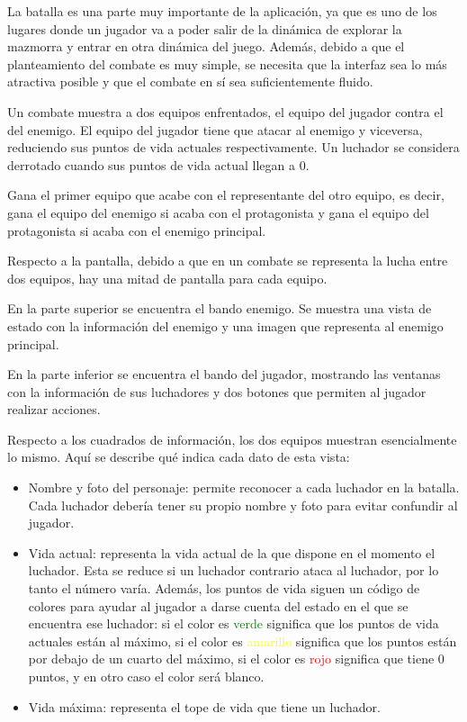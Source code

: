 La batalla es una parte muy importante de la aplicación, ya que es uno de los lugares donde un jugador va a poder salir de la dinámica de explorar la mazmorra y entrar en otra dinámica del juego.
Además, debido a que el planteamiento del combate es muy simple, se necesita que la interfaz sea lo más atractiva posible y que el combate en sí sea suficientemente fluido.

Un combate muestra a dos equipos enfrentados, el equipo del jugador contra el del enemigo. El equipo del jugador tiene que atacar al enemigo y viceversa, reduciendo sus puntos de vida actuales respectivamente. Un luchador se considera derrotado cuando sus puntos de vida actual llegan a 0.

Gana el primer equipo que acabe con el representante del otro equipo, es decir, gana el equipo del enemigo si acaba con el protagonista y gana el equipo del protagonista si acaba con el enemigo principal.

Respecto a la pantalla, debido a que en un combate se representa la lucha entre dos equipos, hay una mitad de pantalla para cada equipo.

En la parte superior se encuentra el bando enemigo. Se muestra una vista de estado con la información del enemigo y una imagen que representa al enemigo principal.

En la parte inferior se encuentra el bando del jugador, mostrando las ventanas con la información de sus luchadores y dos botones que permiten al jugador realizar acciones.

Respecto a los cuadrados de información, los dos equipos muestran esencialmente lo mismo. Aquí se describe qué indica cada dato de esta vista:
\begin{itemize}
	\item Nombre y foto del personaje: permite reconocer a cada luchador en la batalla. Cada luchador debería tener su propio nombre y foto para evitar confundir al jugador.
	\item Vida actual: representa la vida actual de la que dispone en el momento el luchador. Esta se reduce si un luchador contrario ataca al luchador, por lo tanto el número varía.
	Además, los puntos de vida siguen un código de colores para ayudar al jugador a darse cuenta del estado en el que se encuentra ese luchador: si el color es \textcolor{green}{verde} significa que los puntos de vida actuales están al máximo, si el color es \textcolor{yellow}{amarillo} significa que los puntos están por debajo de un cuarto del máximo, si el color es  \textcolor{red}{rojo} significa que tiene 0 puntos, y en otro caso el color será blanco.
	\item Vida máxima: representa el tope de vida que tiene un luchador.
\end{itemize}

